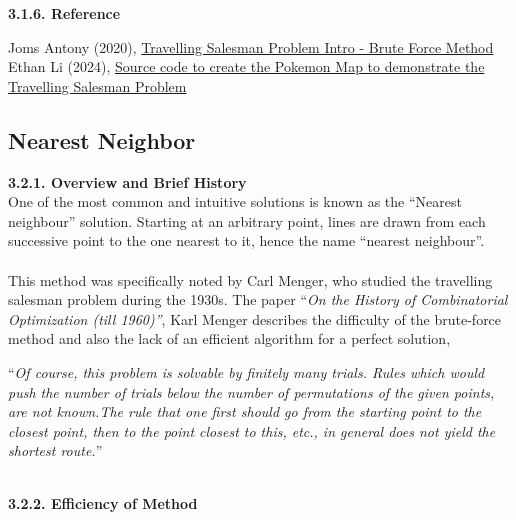 \documentclass{article}
\begin{document}
\textbf{3.1.6. Reference}
\renewcommand{\refname}{\vspace{-2em}} %
\begin{thebibliography}{9}
Joms Antony (2020), \href{https://www.youtube.com/watch?v=R_wLqwTuDzU}{Travelling Salesman Problem Intro - Brute Force Method}
\bibitem{}
Ethan Li (2024), \href{https://github.com/ethan201not404/som-discovery-topic-research-tsp/tree/main/PokemonMap}{Source code to create the Pokemon Map to demonstrate the Travelling Salesman Problem}
\end{thebibliography}


\subsection{Nearest Neighbor}     %

\textbf{3.2.1. Overview and Brief History}
\\One of the most common and intuitive solutions is known as the “Nearest neighbour” solution. Starting at an arbitrary point, lines are drawn from each successive point to the one nearest to it, hence the name “nearest neighbour”. 
\\
\\This method was specifically noted by Carl Menger, who studied the travelling salesman problem during the 1930s. The paper “\textit{On the History of Combinatorial Optimization (till 1960)”}, Karl Menger describes the difficulty of the brute-force method and also the lack of an efficient algorithm for a perfect solution, 
\\
\begin{center}
    “\textit{Of course, this problem is solvable by finitely many trials. Rules which would push the number of trials below the number of permutations of the given points, are not known.The rule that one first should go from the starting point to the closest point, then to the point closest to this, etc., in general does not yield the shortest route.}”
\end{center}\\
\textbf{3.2.2. Efficiency of Method}
\end{document}
